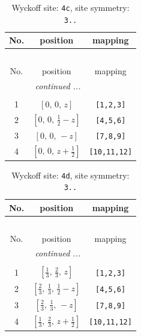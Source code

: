 \documentclass[fleqn,8pt]{jsarticle}
\begin{document}
\renewcommand{\arraystretch}{1.2}
\begin{longtable}{ccc}
\caption{Wyckoff site: {\tt 4c}, site symmetry: {\tt 3..}}
 \\
 \hline \hline
No. & position & mapping \\ \hline \endfirsthead

\multicolumn{2}{l}{\tablename\ \thetable{}} \\
 \hline \hline
No. & position & mapping \\ \hline \endhead

 \hline \hline
\multicolumn{2}{r}{\footnotesize\it continued ...} \\ \endfoot

 \hline \hline
\multicolumn{2}{r}{} \\ \endlastfoot

1 & $\left[ 0,\, 0,\, z \right]$ & {\tt [1,2,3]} \\ \hline
2 & $\left[ 0,\, 0,\, \frac{1}{2} - z \right]$ & {\tt [4,5,6]} \\ \hline
3 & $\left[ 0,\, 0,\, - z \right]$ & {\tt [7,8,9]} \\ \hline
4 & $\left[ 0,\, 0,\, z + \frac{1}{2} \right]$ & {\tt [10,11,12]} \\
\end{longtable}
\renewcommand{\arraystretch}{1.2}
\begin{longtable}{ccc}
\caption{Wyckoff site: {\tt 4d}, site symmetry: {\tt 3..}}
 \\
 \hline \hline
No. & position & mapping \\ \hline \endfirsthead

\multicolumn{2}{l}{\tablename\ \thetable{}} \\
 \hline \hline
No. & position & mapping \\ \hline \endhead

 \hline \hline
\multicolumn{2}{r}{\footnotesize\it continued ...} \\ \endfoot

 \hline \hline
\multicolumn{2}{r}{} \\ \endlastfoot

1 & $\left[ \frac{1}{3},\, \frac{2}{3},\, z \right]$ & {\tt [1,2,3]} \\ \hline
2 & $\left[ \frac{2}{3},\, \frac{1}{3},\, \frac{1}{2} - z \right]$ & {\tt [4,5,6]} \\ \hline
3 & $\left[ \frac{2}{3},\, \frac{1}{3},\, - z \right]$ & {\tt [7,8,9]} \\ \hline
4 & $\left[ \frac{1}{3},\, \frac{2}{3},\, z + \frac{1}{2} \right]$ & {\tt [10,11,12]} \\
\end{longtable}
\end{document}
